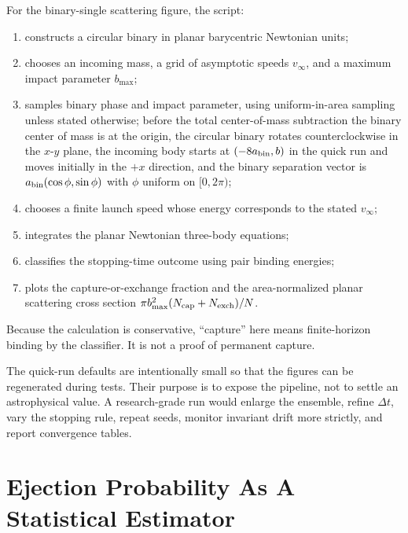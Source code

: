 For the binary-single scattering figure, the script:
\begin{enumerate}
\item constructs a circular binary in planar barycentric Newtonian units;
\item chooses an incoming mass, a grid of asymptotic speeds \(v_\infty\), and a
maximum impact parameter \(b_{\max}\);
\item samples binary phase and impact parameter, using uniform-in-area sampling
unless stated otherwise; before the total center-of-mass subtraction the binary
center of mass is at the origin, the circular binary rotates counterclockwise
in the \(x\)-\(y\) plane, the incoming body starts at
\((-8a_{\rm bin},b)\) in the quick run and moves initially in the \(+x\)
direction, and the binary separation vector is
\(a_{\rm bin}(\cos\phi,\sin\phi)\) with \(\phi\) uniform on \([0,2\pi)\);
\item chooses a finite launch speed whose energy corresponds to the stated
\(v_\infty\);
\item integrates the planar Newtonian three-body equations;
\item classifies the stopping-time outcome using pair binding energies;
\item plots the capture-or-exchange fraction and the area-normalized planar
scattering cross section
\(\pi b_{\max}^2(N_{\rm cap}+N_{\rm exch})/N\).
\end{enumerate}
Because the calculation is conservative, ``capture'' here means finite-horizon
binding by the classifier.  It is not a proof of permanent capture.

The quick-run defaults are intentionally small so that the figures can be
regenerated during tests.  Their purpose is to expose the pipeline, not to
settle an astrophysical value.  A research-grade run would enlarge the ensemble,
refine \(\Delta t\), vary the stopping rule, repeat seeds, monitor invariant
drift more strictly, and report convergence tables.

\section{Ejection Probability As A Statistical Estimator}
\label{sec:ejection-probability-estimator}

